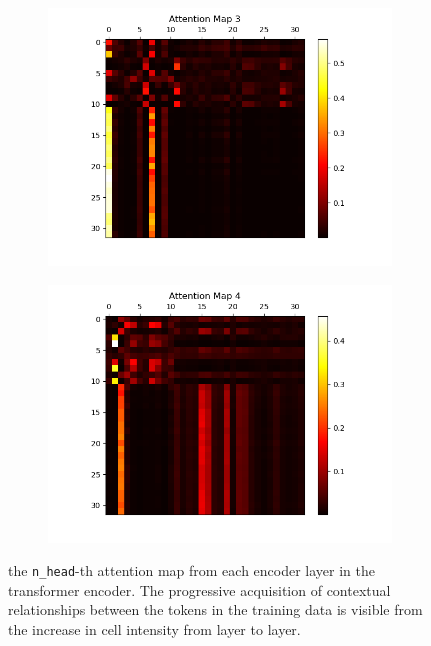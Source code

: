 \documentclass[10pt]{article}
\newcommand{\code}[1]{\texttt{#1}}
\theoremstyle{definition}
\begin{document}
\begin{figure}[H]
\begin{subfigure}[b]{0.35\textwidth}
        \includegraphics[scale=0.4]{../data/plots/part1/attention_map_3.png}
        \label{subfig:am3}
    \end{subfigure}
    \begin{subfigure}[b]{0.35\textwidth}
        \centering
        \includegraphics[scale=0.4]{../data/plots/part1/attention_map_4.png}
        \label{subfig:am4}
    \end{subfigure}
\caption{the \code{n\_head}-th attention map from each encoder layer in the transformer encoder. The progressive acquisition of contextual relationships between the tokens in the training data is visible from the increase in cell intensity from layer to layer.}
\end{figure}
\end{document}
